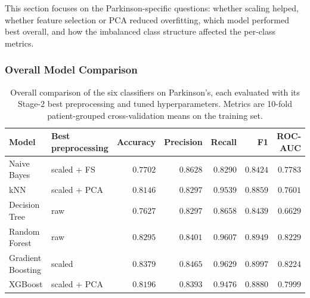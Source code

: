 \documentclass[11pt,a4paper]{article}
\begin{document}
This section focuses on the Parkinson-specific questions: whether scaling
helped, whether feature selection or PCA reduced overfitting, which model
performed best overall, and how the imbalanced class structure affected the
per-class metrics.

\subsubsection{Overall Model Comparison}

\begin{table}[H]
    \centering
    \caption{Overall comparison of the six classifiers on Parkinson's, each
    evaluated with its Stage-2 best preprocessing and tuned hyperparameters.
    Metrics are 10-fold patient-grouped cross-validation means on the
    training set.}
    \label{tab:pd_overall}
    \begin{tabular}{llrrrrr}
        \toprule
        Model & Best preprocessing & Accuracy & Precision & Recall & F1 & ROC-AUC \\
        \midrule
        Naive Bayes        & scaled + FS    & $0.7702$ & $0.8628$ & $0.8290$ & $0.8424$ & $0.7783$ \\
        kNN                & scaled + PCA   & $0.8146$ & $0.8297$ & $0.9539$ & $0.8859$ & $0.7601$ \\
        Decision Tree      & raw            & $0.7627$ & $0.8297$ & $0.8658$ & $0.8439$ & $0.6629$ \\
        Random Forest      & raw            & $0.8295$ & $0.8401$ & $0.9607$ & $0.8949$ & $0.8229$ \\
        Gradient Boosting  & scaled         & $0.8379$ & $0.8465$ & $0.9629$ & $0.8997$ & $0.8224$ \\
        XGBoost            & scaled + PCA   & $0.8196$ & $0.8393$ & $0.9476$ & $0.8880$ & $0.7999$ \\
        \bottomrule
    \end{tabular}
\end{table}
\end{document}
